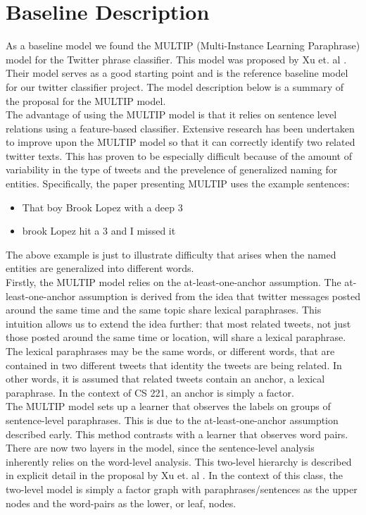 \documentclass[conference]{IEEEtran}
\begin{document}
\section{Baseline Description}
As a baseline model we found the MULTIP (Multi-Instance Learning Paraphrase) model for the Twitter phrase classifier. This model was proposed by Xu et. al \cite{zane}. Their model serves as a good starting point and is the reference baseline model for our twitter classifier project. The model description below is a summary of the proposal for the MULTIP model. \\

The advantage of using the MULTIP model is that it relies on sentence level relations using a feature-based classifier. Extensive research has been undertaken to improve upon the MULTIP model so that it can correctly identify two related twitter texts. This has proven to be especially difficult because of the amount of variability in the type of tweets and the prevelence of generalized naming for entities. Specifically, the paper presenting MULTIP uses the example sentences:

\begin{itemize}
\item That boy Brook Lopez with a deep 3
\item brook Lopez hit a 3 and I missed it
\end{itemize}

The above example is just to illustrate difficulty that arises when the named entities are generalized into different words. \\

Firstly, the MULTIP model relies on the at-least-one-anchor assumption. The at-least-one-anchor assumption is derived from the idea that twitter messages posted around the same time and the same topic share lexical paraphrases. This intuition allows us to extend the idea further: that most related tweets, not just those posted around the same time or location, will share a lexical paraphrase. The lexical paraphrases may be the same words, or different words, that are contained in two different tweets that identity the tweets are being related. In other words, it is assumed that related tweets contain an anchor, a lexical paraphrase. In the context of CS 221, an anchor is simply a factor. \\

The MULTIP model sets up a learner that observes the labels on groups of sentence-level paraphrases. This is due to the at-least-one-anchor assumption described early. This method contrasts with a learner that observes word pairs. There are now two layers in the model, since the sentence-level analysis inherently relies on the word-level analysis. This two-level hierarchy is described in explicit detail in the proposal by Xu et. al \cite{zane}. In the context of this class, the two-level model is simply a factor graph with paraphrases/sentences as the upper nodes and the word-pairs as the lower, or leaf, nodes.\medskip
\end{document}
